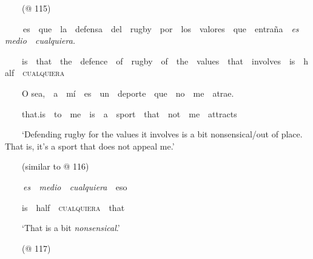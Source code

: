 \begin{styleStandard}
\ \ \ \ (@ 115)
\end{styleStandard}

\begin{styleStandard}
\label{bkm:Ref150786444}\textbf{\ \ }\ \ es\ \ que\ \ la\ \ defensa\ \ del\ \ rugby\ \ por\ \ los\ \ valores\ \ que\ \ entraña\ \ \textit{es\ \ medio\ \ cualquiera.}
\end{styleStandard}

\begin{styleStandard}
\ \ \ \ is\ \ that\ \ the\ \ defence\ \ of\ \ rugby\ \ of\ \ the\ \ values\ \ that\ \ involves\ \ is\ \ half\ \ \textsc{cualquiera}
\end{styleStandard}

\begin{styleStandard}
\ \ \ \ O sea,\ \ a\ \ mí\ \ es\ \ un\ \ deporte\ \ que\ \ no\ \ me\ \ atrae.\ \ \textbf{\ \ \ \ }
\end{styleStandard}

\begin{styleStandard}
\ \ \ \ that.is\ \ to\ \ me\ \ is\ \ a\ \ sport\ \ that\ \ not\ \ me\ \ attracts\ \ \ \ \ \ 
\end{styleStandard}

\begin{styleStandard}
\ \ \ \ ‘Defending rugby for the values it involves is a bit nonsensical/out of place. That is, it’s a sport that does not appeal me.’
\end{styleStandard}

\begin{styleStandard}
\ \ \ \ (similar to @ 116)
\end{styleStandard}

\begin{styleStandard}
\label{bkm:Ref150786457}\textbf{\ \ }\ \ \textit{es\ \ medio\ \ cualquiera\ \ }eso
\end{styleStandard}

\begin{styleStandard}
\ \ \ \ is\ \ half\ \ \textsc{cualquiera}\ \ that
\end{styleStandard}

\begin{styleStandard}
\ \ \ \ ‘That is a bit\textit{ nonsensical}.’
\end{styleStandard}

\begin{styleStandard}
\ \ \ \ (@ 117)
\end{styleStandard}

